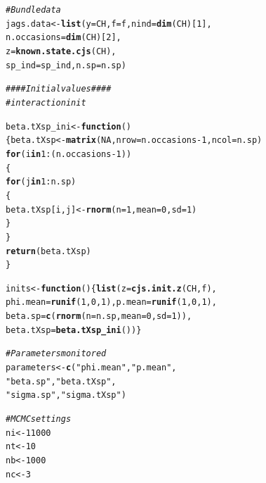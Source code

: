 \documentclass[a4paper, 10pt]{scrartcl}\usepackage[]{graphicx}\usepackage[]{color}
\makeatletter
\newcommand{\hlnum}[1]{\textcolor[rgb]{0.686,0.059,0.569}{#1}}%
\newcommand{\hlstr}[1]{\textcolor[rgb]{0.192,0.494,0.8}{#1}}%
\newcommand{\hlcom}[1]{\textcolor[rgb]{0.678,0.584,0.686}{\textit{#1}}}%
\newcommand{\hlopt}[1]{\textcolor[rgb]{0,0,0}{#1}}%
\newcommand{\hlstd}[1]{\textcolor[rgb]{0.345,0.345,0.345}{#1}}%
\newcommand{\hlkwa}[1]{\textcolor[rgb]{0.161,0.373,0.58}{\textbf{#1}}}%
\newcommand{\hlkwb}[1]{\textcolor[rgb]{0.69,0.353,0.396}{#1}}%
\newcommand{\hlkwc}[1]{\textcolor[rgb]{0.333,0.667,0.333}{#1}}%
\newcommand{\hlkwd}[1]{\textcolor[rgb]{0.737,0.353,0.396}{\textbf{#1}}}%
\newenvironment{kframe}{%
 \def\at@end@of@kframe{}%
 \ifinner\ifhmode%
  \def\at@end@of@kframe{\end{minipage}}%
  \begin{minipage}{\columnwidth}%
 \fi\fi%
 \def\FrameCommand##1{\hskip\@totalleftmargin \hskip-\fboxsep
 \colorbox{shadecolor}{##1}\hskip-\fboxsep
     \hskip-\linewidth \hskip-\@totalleftmargin \hskip\columnwidth}%
 \MakeFramed {\advance\hsize-\width
   \@totalleftmargin\z@ \linewidth\hsize
   \@setminipage}}%
 {\par\unskip\endMakeFramed%
 \at@end@of@kframe}
\newenvironment{knitrout}{}{} %
\makeatother
\begin{document}
\begin{knitrout}
\color{fgcolor}\begin{kframe}
\begin{alltt}
\hlcom{# Bundle data}
\hlstd{jags.data} \hlkwb{<-} \hlkwd{list}\hlstd{(}\hlkwc{y} \hlstd{= CH,} \hlkwc{f} \hlstd{= f,} \hlkwc{nind} \hlstd{=} \hlkwd{dim}\hlstd{(CH)[}\hlnum{1}\hlstd{],}
                  \hlkwc{n.occasions} \hlstd{=} \hlkwd{dim}\hlstd{(CH)[}\hlnum{2}\hlstd{],}
                  \hlkwc{z} \hlstd{=} \hlkwd{known.state.cjs}\hlstd{(CH),}
                  \hlkwc{sp_ind}\hlstd{=sp_ind,} \hlkwc{n.sp}\hlstd{=n.sp)}

\hlcom{#### Initial values####}
\hlcom{#interaction init}

\hlstd{beta.tXsp_ini}\hlkwb{<-}\hlkwa{function}\hlstd{()}
\hlstd{\{beta.tXsp}\hlkwb{<-}\hlkwd{matrix}\hlstd{(}\hlnum{NA}\hlstd{,}\hlkwc{nrow} \hlstd{= n.occasions}\hlopt{-}\hlnum{1}\hlstd{,}\hlkwc{ncol} \hlstd{= n.sp)}
\hlkwa{for} \hlstd{(i} \hlkwa{in} \hlnum{1}\hlopt{:}\hlstd{(n.occasions}\hlopt{-}\hlnum{1}\hlstd{))}
  \hlstd{\{}
    \hlkwa{for} \hlstd{(j} \hlkwa{in} \hlnum{1}\hlopt{:}\hlstd{n.sp)}
      \hlstd{\{}
        \hlstd{beta.tXsp[i,j]}\hlkwb{<-}\hlkwd{rnorm}\hlstd{(}\hlkwc{n} \hlstd{=} \hlnum{1}\hlstd{,}\hlkwc{mean} \hlstd{=} \hlnum{0}\hlstd{,}\hlkwc{sd} \hlstd{=} \hlnum{1}\hlstd{)}
      \hlstd{\}}
  \hlstd{\}}
\hlkwd{return}\hlstd{(beta.tXsp)}
\hlstd{\}}

\hlstd{inits} \hlkwb{<-} \hlkwa{function}\hlstd{()\{}\hlkwd{list}\hlstd{(}\hlkwc{z} \hlstd{=} \hlkwd{cjs.init.z}\hlstd{(CH, f),}
                  \hlkwc{phi.mean} \hlstd{=} \hlkwd{runif}\hlstd{(}\hlnum{1}\hlstd{,} \hlnum{0}\hlstd{,} \hlnum{1}\hlstd{),} \hlkwc{p.mean} \hlstd{=} \hlkwd{runif}\hlstd{(}\hlnum{1}\hlstd{,} \hlnum{0}\hlstd{,} \hlnum{1}\hlstd{),}
                  \hlkwc{beta.sp}\hlstd{=}\hlkwd{c}\hlstd{(}\hlkwd{rnorm}\hlstd{(}\hlkwc{n} \hlstd{= n.sp,}\hlkwc{mean} \hlstd{=} \hlnum{0}\hlstd{,}\hlkwc{sd}\hlstd{=}\hlnum{1} \hlstd{) ),}
                  \hlkwc{beta.tXsp}\hlstd{=} \hlkwd{beta.tXsp_ini}\hlstd{() )\}}

\hlcom{# Parameters monitored}
\hlstd{parameters} \hlkwb{<-} \hlkwd{c}\hlstd{(}\hlstr{"phi.mean"}\hlstd{,} \hlstr{"p.mean"}\hlstd{,}
                \hlstr{"beta.sp"}\hlstd{,}\hlstr{"beta.tXsp"}\hlstd{,}
                \hlstr{"sigma.sp"}\hlstd{,} \hlstr{"sigma.tXsp"}\hlstd{)}

\hlcom{# MCMC settings}
\hlstd{ni} \hlkwb{<-} \hlnum{11000}
\hlstd{nt} \hlkwb{<-} \hlnum{10}
\hlstd{nb} \hlkwb{<-} \hlnum{1000}
\hlstd{nc} \hlkwb{<-} \hlnum{3}


\end{alltt}
\end{kframe}
\end{knitrout}
\end{document}
